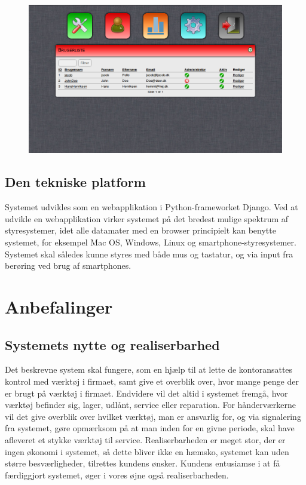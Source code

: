 \documentclass{article}
\begin{document}
\begin{figure}[htbp]
\includegraphics[scale=0.40]{./figures/Users.png}
\end{figure}

 
\subsection{Den tekniske platform}

Systemet udvikles som en webapplikation i Python-frameworket Django. Ved at udvikle en webapplikation virker systemet på det bredest mulige spektrum af styresystemer, idet alle datamater med en browser principielt kan benytte systemet, for eksempel Mac OS, Windows, Linux og smartphone-styresystemer. Systemet skal således kunne styres med både mus og tastatur, og via input fra berøring ved brug af smartphones. 

\section{Anbefalinger}

\subsection{Systemets nytte og realiserbarhed}
Det beskrevne system skal fungere, som en hjælp til at lette de kontoransattes kontrol med værktøj i firmaet, samt give et overblik over, hvor mange penge der er brugt på værktøj i firmaet. Endvidere vil det altid i systemet fremgå, hvor værktøj befinder sig, lager, udlånt, service eller reparation. 
For hånderværkerne vil det give overblik over hvilket værktøj, man er ansvarlig for, og via signalering fra systemet, gøre opmærksom på at man inden for en givne periode, skal have afleveret et stykke værktøj til service. 
Realiserbarheden er meget stor, der er ingen økonomi i systemet, så dette bliver ikke en hæmsko, systemet kan uden større besværligheder, tilrettes kundens ønsker. Kundens entusiamse i at få færdiggjort systemet, øger i vores øjne også realiserbarheden.   
\end{document}
